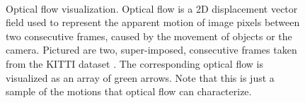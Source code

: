 \begin{figure}[t]
\begin{center}
	\\
	\caption[Optical flow visualization]{Optical flow visualization. Optical flow is a 2D displacement vector field used to represent the apparent motion of image pixels between two consecutive frames, caused by the movement of objects or the camera. Pictured are two, super-imposed, consecutive frames taken from the KITTI dataset \cite{geiger2013vision}. The corresponding optical flow is visualized as an array of green arrows. Note that this is just a sample of the motions that optical flow can characterize.}
	\vspace{-0.65cm}
	\label{fig:optical_flow}
\end{center}
\end{figure}